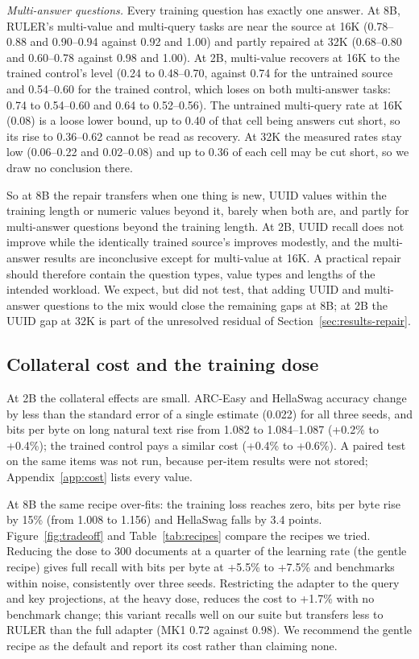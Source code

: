 \documentclass[11pt]{article}
\begin{document}
\emph{Multi-answer questions.} Every training question has exactly one answer. At 8B, RULER's multi-value and multi-query tasks are near the source at 16K (0.78--0.88 and 0.90--0.94 against 0.92 and 1.00) and partly repaired at 32K (0.68--0.80 and 0.60--0.78 against 0.98 and 1.00). At 2B, multi-value recovers at 16K to the trained control's level (0.24 to 0.48--0.70, against 0.74 for the untrained source and 0.54--0.60 for the trained control, which loses on both multi-answer tasks: 0.74 to 0.54--0.60 and 0.64 to 0.52--0.56). The untrained multi-query rate at 16K (0.08) is a loose lower bound, up to 0.40 of that cell being answers cut short, so its rise to 0.36--0.62 cannot be read as recovery. At 32K the measured rates stay low (0.06--0.22 and 0.02--0.08) and up to 0.36 of each cell may be cut short, so we draw no conclusion there.

So at 8B the repair transfers when one thing is new, UUID values within the training length or numeric values beyond it, barely when both are, and partly for multi-answer questions beyond the training length. At 2B, UUID recall does not improve while the identically trained source's improves modestly, and the multi-answer results are inconclusive except for multi-value at 16K. A practical repair should therefore contain the question types, value types and lengths of the intended workload. We expect, but did not test, that adding UUID and multi-answer questions to the mix would close the remaining gaps at 8B; at 2B the UUID gap at 32K is part of the unresolved residual of Section~\ref{sec:results-repair}.

\subsection{Collateral cost and the training dose}
\label{sec:cost}
At 2B the collateral effects are small. ARC-Easy and HellaSwag accuracy change by less than the standard error of a single estimate (0.022) for all three seeds, and bits per byte on long natural text rise from 1.082 to 1.084--1.087 (+0.2\% to +0.4\%); the trained control pays a similar cost (+0.4\% to +0.6\%). A paired test on the same items was not run, because per-item results were not stored; Appendix~\ref{app:cost} lists every value.

At 8B the same recipe over-fits: the training loss reaches zero, bits per byte rise by 15\% (from 1.008 to 1.156) and HellaSwag falls by 3.4 points. Figure~\ref{fig:tradeoff} and Table~\ref{tab:recipes} compare the recipes we tried. Reducing the dose to 300 documents at a quarter of the learning rate (the gentle recipe) gives full recall with bits per byte at +5.5\% to +7.5\% and benchmarks within noise, consistently over three seeds. Restricting the adapter to the query and key projections, at the heavy dose, reduces the cost to +1.7\% with no benchmark change; this variant recalls well on our suite but transfers less to RULER than the full adapter (MK1 0.72 against 0.98). We recommend the gentle recipe as the default and report its cost rather than claiming none.
\end{document}
